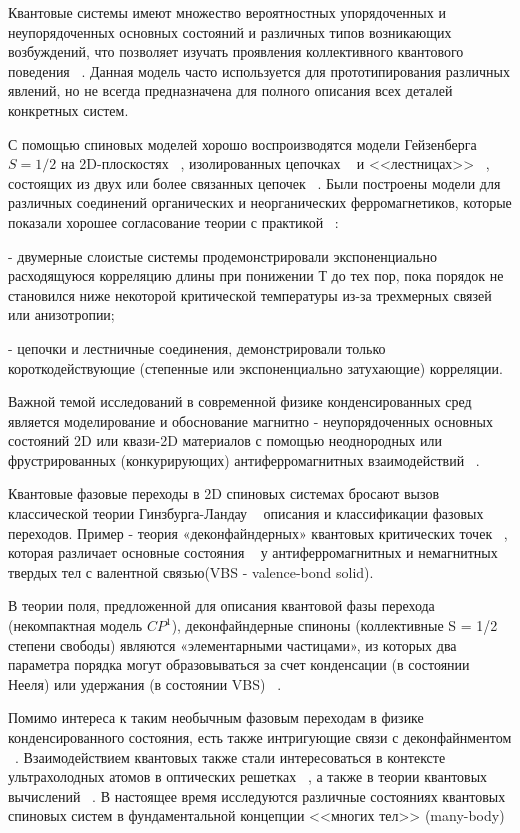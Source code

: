 \documentclass[11pt]{article}
\begin{document}
Квантовые системы имеют множество вероятностных упорядоченных и неупорядоченных основных состояний и различных типов возникающих возбуждений, что позволяет изучать проявления коллективного квантового поведения ~\cite{auerbach}. Данная модель часто используется для прототипирования различных явлений, но не всегда предназначена для полного описания всех деталей конкретных систем.

С помощью спиновых моделей хорошо воспроизводятся модели Гейзенберга $S=1/2$ на 2D-плоскостях ~\cite{prb_39_2344,rmp_63_1}, изолированных цепочках ~\cite{pr_73_332, prb_53_5116} и <<лестницах>> ~\cite{s_271}, состоящих из двух или более связанных цепочек ~\cite{s_271}. Были построены модели для различных соединений органических и неорганических ферромагнетиков, которые показали хорошее согласование теории с практикой ~\cite{mrs_25}: 

- двумерные слоистые системы продемонстрировали экспоненциально расходящуюся корреляцию длины при понижении Т до тех пор, пока порядок не становился ниже некоторой критической температуры из-за трехмерных связей или анизотропии;

- цепочки и лестничные соединения, демонстрировали только короткодействующие (степенные или экспоненциально затухающие) корреляции.

Важной темой исследований в современной физике конденсированных сред является моделирование и обоснование магнитно - неупорядоченных основных состояний 2D или квази-2D материалов с помощью
неоднородных или фрустрированных (конкурирующих) антиферромагнитных взаимодействий ~\cite{schol, diep, rmp_82, nature_464_199}.

Квантовые фазовые переходы в 2D спиновых системах бросают вызов классической теории Гинзбурга-Ландау ~\cite{cardy} описания и классификации фазовых переходов. Пример - теория «деконфайндерных» квантовых критических точек ~\cite{sc_303_1490}, которая различает основные состояния ~\cite{prl_98_227202} у антиферромагнитных  и немагнитных твердых тел с валентной связью(VBS - valence-bond solid). 

В теории поля, предложенной для описания квантовой фазы перехода (некомпактная модель $CP^1$), деконфайндерные спиноны (коллективные S = 1/2 степени свободы) являются «элементарными частицами», из которых два параметра порядка могут образовываться за счет конденсации (в состоянии Нееля) или удержания (в состоянии VBS) ~\cite{sc_303_1490}.

Помимо интереса к таким необычным фазовым переходам в физике конденсированного состояния,
есть также интригующие связи с деконфайнментом ~\cite{ap_325}. Взаимодействием квантовых также стали интересоваться в контексте ультрахолодных атомов в оптических решетках ~\cite{rmp_80_885, nature_465}, а также в теории квантовых вычислений ~\cite{ap_57_143,Sysoev,Courcera_KvVich}. 
В настоящее время исследуются различные состояниях квантовых спиновых систем в фундаментальной концепции <<многих тел>> (many-body) ~\cite{pr_96,prl_104_157201}
\end{document}
